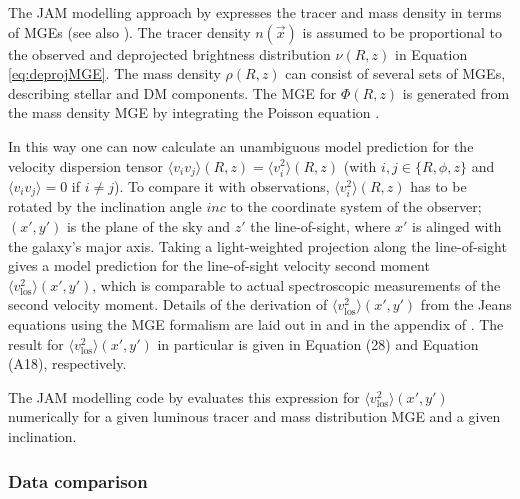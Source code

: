 \documentclass[useAMS,usenatbib]{mnras}
\newcommand{\vect}[1]{\vec{#1}} %
\begin{document}
The JAM modelling approach by \citet{Cap08} expresses the tracer and mass density in terms of MGEs (see also \citealt{1994A&A...285..723E}). The tracer density $n(\vect{x})$ is assumed to be proportional to the observed and deprojected brightness distribution $\nu(R,z)$ in Equation \eqref{eq:deprojMGE}. The mass density $\rho(R,z)$ can consist of several sets of MGEs, describing stellar and DM components. The MGE for $\Phi(R,z)$ is generated from the mass density MGE by integrating the Poisson equation \citep{1994A&A...285..723E}. 

In this way one can now calculate an unambiguous model prediction for the velocity dispersion tensor $\langle v_i v_j \rangle(R,z) = \langle v_i^2 \rangle(R,z)$ (with $i,j \in \{ R,\phi, z\}$ and $\langle v_i v_j \rangle=0$ if $i\neq j$). To compare it with observations, $\langle v_i^2 \rangle(R,z)$ has to be rotated by the inclination angle $inc$ to the coordinate system of the observer; $(x',y')$ is the plane of the sky and $z'$ the line-of-sight, where $x'$ is alinged with the galaxy's major axis. Taking a light-weighted projection along the line-of-sight gives a model prediction for the line-of-sight velocity second moment $\langle v_\text{los}^2\rangle(x',y')$, which is comparable to actual spectroscopic measurements of the second velocity moment. Details of the derivation of $\langle v_\text{los}^2\rangle(x',y')$ from the Jeans equations using the MGE formalism are laid out in \citet{Cap08} and in the appendix of \citet{GlennEC}. The result for $\langle v_\text{los}^2\rangle(x',y')$ in particular is given in Equation (28) and Equation (A18), respectively.

The JAM modelling code by \citet{Cap08} evaluates this expression for $\langle v_\text{los}^2\rangle(x',y')$ numerically for a given luminous tracer and mass distribution MGE and a given inclination.

\subsubsection{Data comparison} \label{sec:model_JAM_compare}
\end{document}
